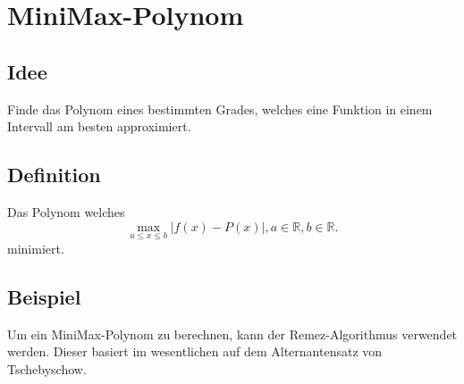 %
%
%
\section{MiniMax-Polynom 
\label{transfer:section:teil3}}



\subsection{Idee
\label{transfer:subsection:idee}}
Finde das Polynom eines bestimmten Grades, welches eine Funktion in einem Intervall am besten approximiert.


\subsection{Definition
	\label{transfer:subsection:definition}}
Das Polynom welches 
	    $$ \max _{a \leq x \leq b}|f(x)-P(x)| , a \in \mathbb{R}, b \in \mathbb{R}.$$
minimiert.
\subsection{Beispiel
	\label{transfer:subsection:beispiel}}
Um ein MiniMax-Polynom zu berechnen, kann der Remez-Algorithmus verwendet werden. Dieser basiert im wesentlichen auf dem Alternantensatz von Tschebyschow.


